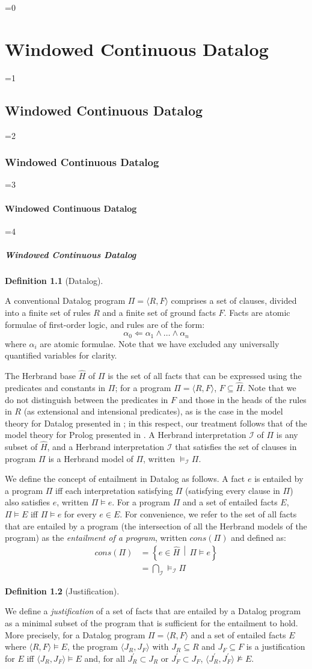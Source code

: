 \documentclass[twocolumn,preprint,3p,number]{elsarticle}
\theoremstyle{plain}
\theoremstyle{definition}
\newtheorem{definition}{Definition}
\newcounter{nestingdepth}
\newenvironment{nestedsection}[2]{
  \ifnum\value{nestingdepth}=0
    \chapter{#1}
  \else
    \ifnum\value{nestingdepth}=1
      \section{#1}
    \else
      \ifnum\value{nestingdepth}=2
        \subsection{#1}
      \else
        \ifnum\value{nestingdepth}=3
          \subsubsection{#1}
        \else
          \ifnum\value{nestingdepth}=4
            \paragraph{#1}
          \else
            \PackageError{nestedsections}{Maximum nesting level exceeded!}{uh oh!}
          \fi
        \fi
      \fi
    \fi
  \fi
  \addtocounter{nestingdepth}{1}
  \label{sec:#2}
}{\addtocounter{nestingdepth}{-1}}
\def\labeldef#1{\label{def:#1}}
\begin{document}
\begin{nestedsection}{Windowed Continuous Datalog}{semantics}
\begin{definition}[Datalog]
\labeldef{continuous datalog: datalog program}

A conventional Datalog program $\Pi = \langle R, F\rangle$ comprises a
set of clauses, divided into a finite set of rules $R$ and a finite
set of ground facts $F$. Facts are atomic formulae of first-order logic, and
rules are of the form:
\[ \alpha_0 \Leftarrow \alpha_1 \land \ldots \land \alpha_n \]
where $\alpha_i$ are atomic formulae. Note that we have excluded any
universally quantified variables for clarity.

The Herbrand base $\hat{H}$ of $\Pi$ is the set of all facts that can
be expressed using the predicates and constants in $\Pi$; for a program $\Pi =
\langle R, F \rangle$, $F \subseteq \hat{H}$. Note that we do not
distinguish between the predicates in $F$ and those in the heads of
the rules in $R$ (as extensional and intensional predicates), as is
the case in the model theory for Datalog presented in
\cite{datalog-basics}; in this respect, our treatment follows that of
the model theory for Prolog presented in \cite{prolog-semantics}. A
Herbrand interpretation $\mathcal{I}$ of $\Pi$ is any subset of
$\hat{H}$, and a Herbrand interpretation $\mathcal{I}$ that satisfies
the set of clauses in program $\Pi$ is a Herbrand model of $\Pi$,
written $\models_{\mathcal{I}} \Pi$.

We define the concept of entailment in Datalog as follows. A fact $e$
is entailed by a program $\Pi$ iff each interpretation satisfying
$\Pi$ (satisfying every clause in $\Pi$) also satisfies $e$, written
$\Pi \models e$. For a program $\Pi$ and a set of entailed facts
$E$, $\Pi \models E$ iff $\Pi \models e$ for every $e \in E$. For
convenience, we refer to the set of all facts that are entailed by a
program (the intersection of all the Herbrand models of the program)
as the {\em entailment of a program}, written $cons(\Pi)$ and defined
as:
\begin{align*}
  cons(\Pi) &= \left\{ e \in \hat{H} \,\middle\vert\, \Pi \models e \right\} \\
  &= \bigcap_\mathcal{I} \models_\mathcal{I} \Pi
\end{align*}
\end{definition}

\begin{definition}[Justification]
\labeldef{continuous datalog: justification}

We define a {\em justification} of a set of facts that are entailed by
a Datalog program as a minimal subset of the program that is
sufficient for the entailment to hold. More precisely, for a Datalog
program $\Pi = \langle R, F \rangle$ and a set of entailed facts $E$
where $\langle R, F \rangle \models E$, the program $\langle J_R, J_F
\rangle$ with ${J_R \subseteq R}$ and ${J_F \subseteq F}$ is a
justification for $E$ iff $\langle J_R, J_F \rangle \models E$ and,
for all ${J^\prime_R \subset J_R}$ or ${J^\prime_F \subset J_F}$, ${\langle J^\prime_R, J^\prime_F
\rangle \not\models E}$.


\end{definition}
\end{nestedsection}
\end{document}
